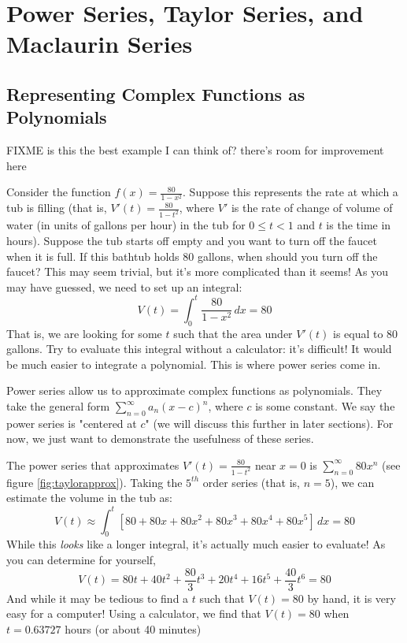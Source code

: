 \chapter{Power Series, Taylor Series, and Maclaurin Series}

\section{Representing Complex Functions as Polynomials}
FIXME is this the best example I can think of? there's room for improvement here

Consider the function $f(x) = \frac{80}{1-x^2}$. Suppose this represents the 
rate at which a tub is filling (that is, $V'(t) = \frac{80}{1-t^2}$, where 
$V'$ is the rate of change of volume of water (in units of gallons per hour) 
in the tub for $0 \leq t < 1$ and $t$ is the time in hours). Suppose the tub 
starts off empty and you want to turn off the faucet when it is full. If this 
bathtub holds 80 gallons, when should you turn off the faucet? This may seem 
trivial, but it's more complicated than it seems! As you may have guessed, we 
need to set up an integral:
$$V(t) = \int_{0}^t \frac{80}{1-x^2}\,dx = 80$$
That is, we are looking for some $t$ such that the area under $V'(t)$ is equal 
to 80 gallons. Try to evaluate this integral without a calculator: it's 
difficult! It would be much easier to integrate a polynomial. This is where 
power series come in.

Power series allow us to approximate complex functions as polynomials. They 
take the general form $\sum_{n=0}^\infty a_n (x - c)^n$, where $c$ is some 
constant. We say the power series is "centered at $c$" (we will discuss this 
further in later sections). For now, we just want to demonstrate the usefulness 
of these series. 

The power series that approximates $V'(t) = \frac{80}{1-t^2}$ near $x = 0$ is 
$\sum_{n=0}^\infty 80x^n$ (see figure \ref{fig:taylorapprox}). Taking the 
$5^{th}$ order series (that is, $n = 5$), we can estimate the volume in the 
tub as:
$$V(t) \approx \int_{0}^t \left[80 + 80x + 80x^2 + 80x^3 + 80x^4 + 80x^5 
\right]\,dx = 80$$
While this \textit{looks} like a longer integral, it's actually much easier 
to evaluate! As you can determine for yourself, 
$$V(t) = 80t + 40t^2 + \frac{80}{3}t^3 + 20t^4 + 16t^5 + \frac{40}{3}t^6 = 80$$
And while it may be tedious to find a $t$ such that $V(t) = 80$ by hand, it is 
very easy for a computer! Using a calculator, we find that $V(t) = 80$ when $t 
= 0.63727$ hours (or  about 40 minutes)

